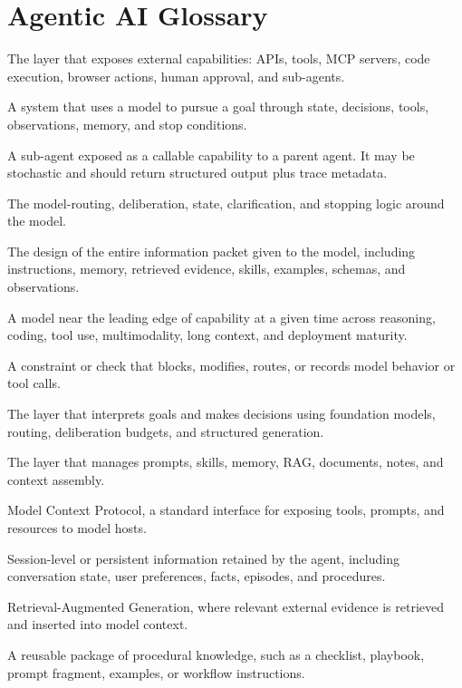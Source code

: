 \chapter{Agentic AI Glossary}

\begin{description}[leftmargin=*]
  \item[Action layer.] The layer that exposes external capabilities: APIs, tools, MCP servers, code execution, browser actions, human approval, and sub-agents.
  \item[Agent.] A system that uses a model to pursue a goal through state, decisions, tools, observations, memory, and stop conditions.
  \item[Agent as a tool.] A sub-agent exposed as a callable capability to a parent agent. It may be stochastic and should return structured output plus trace metadata.
  \item[Cognitive architecture.] The model-routing, deliberation, state, clarification, and stopping logic around the model.
  \item[Context engineering.] The design of the entire information packet given to the model, including instructions, memory, retrieved evidence, skills, examples, schemas, and observations.
  \item[Frontier model.] A model near the leading edge of capability at a given time across reasoning, coding, tool use, multimodality, long context, and deployment maturity.
  \item[Guardrail.] A constraint or check that blocks, modifies, routes, or records model behavior or tool calls.
  \item[Intelligence layer.] The layer that interprets goals and makes decisions using foundation models, routing, deliberation budgets, and structured generation.
  \item[Knowledge layer.] The layer that manages prompts, skills, memory, RAG, documents, notes, and context assembly.
  \item[MCP.] Model Context Protocol, a standard interface for exposing tools, prompts, and resources to model hosts.
  \item[Memory.] Session-level or persistent information retained by the agent, including conversation state, user preferences, facts, episodes, and procedures.
  \item[RAG.] Retrieval-Augmented Generation, where relevant external evidence is retrieved and inserted into model context.
  \item[Skill.] A reusable package of procedural knowledge, such as a checklist, playbook, prompt fragment, examples, or workflow instructions.

\end{description}
